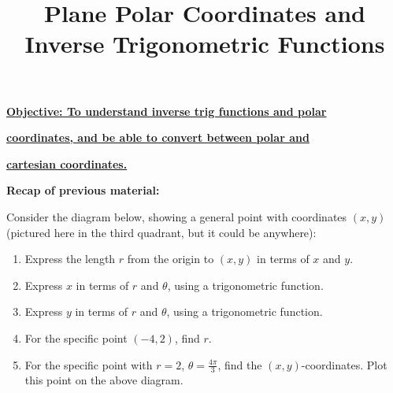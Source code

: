 \documentclass{article}
\begin{document}
\title{Plane Polar Coordinates and Inverse Trigonometric Functions}
\date{}

\maketitle
\thispagestyle{empty}

\Large

{\bf \underline{Objective: To understand inverse trig functions and polar}}

{\bf \underline{coordinates, and be able to convert between polar and}}

{\bf \underline{cartesian coordinates.}}

\vspace{5mm}


{\bf Recap of previous material:}

\vspace{5mm}


Consider the diagram below, showing a general point with coordinates $(x,y)$ (pictured here in the third quadrant, but it could be anywhere):

\begin{center}
\end{center}



\begin{enumerate}
\item Express the length $r$ from the origin to $(x,y)$ in terms of $x$ and $y$.
\item Express $x$ in terms of $r$ and $\theta$, using a trigonometric function.
\item Express $y$ in terms of $r$ and $\theta$, using a trigonometric function.
\item For the specific point $(-4,2)$, find $r$.
\item For the specific point with $r=2$, $\theta=\frac{4\pi}{3}$, find the $(x,y)$-coordinates. Plot this point on the above diagram.
\end{enumerate}
\end{document}
